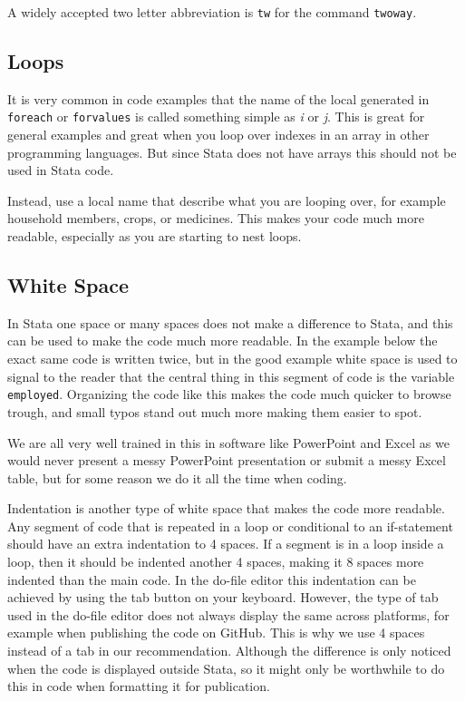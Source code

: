 A widely accepted two letter abbreviation is \verb|tw| for the command \verb|twoway|.

\subsection{Loops}

It is very common in code examples that the name of the local generated in \verb|foreach| or \verb|forvalues| 
is called something simple as \textit{i} or \textit{j}. This is great for general examples and great when you 
loop over indexes in an array in other programming languages. But since Stata does not have arrays this should 
not be used in Stata code.

Instead, use a local name that describe what you are looping over, for example household members, crops, or 
medicines. This makes your code much more readable, especially as you are starting to nest loops.


\subsection{White Space}

In Stata one space or many spaces does not make a difference to Stata, and this can be used to make the code 
much more readable. In the example below the exact same code is written twice, but in the good example white 
space is used to signal to the reader that the central thing in this segment of code is the variable 
\verb|employed|. Organizing the code like this makes the code much quicker to browse trough, and small typos 
stand out much more making them easier to spot.

We are all very well trained in this in software like PowerPoint and Excel as we would never present a messy 
PowerPoint presentation or submit a messy Excel table, but for some reason we do it all the time when coding.


Indentation is another type of white space that makes the code more readable. Any segment of code that is 
repeated in a loop or conditional to an if-statement should have an extra indentation to 4 spaces. If a 
segment is in a loop inside a loop, then it should be indented another 4 spaces, making it 8 spaces more 
indented than the main code. In the do-file editor this indentation can be achieved by using the tab button on 
your keyboard. However, the type of tab used in the do-file editor does not always display the same across 
platforms, for example when publishing the code on GitHub. This is why we use 4 spaces instead of a tab in our 
recommendation. Although the difference is only noticed when the code is displayed outside Stata, so it might 
only be worthwhile to do this in code when formatting it for publication. 

